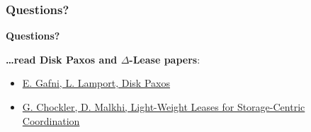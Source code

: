 \documentclass[10pt,utf8]{beamer}
\begin{document}
\begin{frame}
    \frametitle{Questions?}
    \centering
    \textbf{\Huge{Questions?}}
    
    \vspace{1cm}
    
    \centering
    \textbf{\dots read Disk Paxos and $\Delta$-Lease papers}:
    \vspace{0.5cm}
    \begin{itemize}
     \item \small\color{blue}\href{http://lamport.azurewebsites.net/pubs/disk-paxos-disc.pdf}{E. Gafni, L. Lamport, Disk Paxos}\color{black}
     \item \color{blue}\href{https://groups.csail.mit.edu/tds/papers/Chockler/TR934.ps}{G. Chockler, D. Malkhi, Light-Weight Leases for Storage-Centric Coordination}\color{black}
    \end{itemize}

\end{frame}
    
\end{document}
